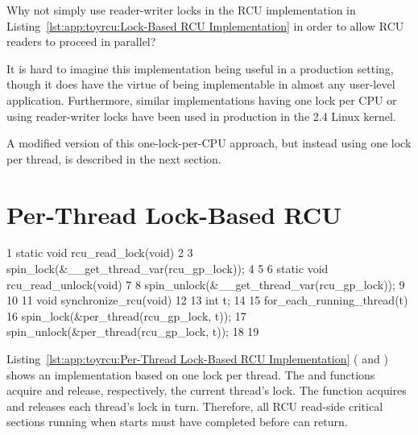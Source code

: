\QuickQuiz{}
	Why not simply use reader-writer locks in the RCU implementation
	in
	Listing~\ref{lst:app:toyrcu:Lock-Based RCU Implementation}
	in order to allow RCU readers to proceed in parallel?
 \QuickQuizEnd

It is hard to imagine this implementation being useful
in a production setting, though it does have the virtue
of being implementable in almost any user-level application.
Furthermore, similar implementations having one lock per CPU
or using reader-writer locks have been used in production
in the 2.4 Linux kernel.

A modified version of this one-lock-per-CPU approach, but instead using
one lock per thread, is described
in the next section.

\section{Per-Thread Lock-Based RCU}
\label{sec:app:toyrcu:Per-Thread Lock-Based RCU}

\begin{listing}[tbp]
{ \scriptsize
\begin{verbbox}
  1 static void rcu_read_lock(void)
  2 {
  3   spin_lock(&__get_thread_var(rcu_gp_lock));
  4 }
  5
  6 static void rcu_read_unlock(void)
  7 {
  8   spin_unlock(&__get_thread_var(rcu_gp_lock));
  9 }
 10
 11 void synchronize_rcu(void)
 12 {
 13   int t;
 14
 15   for_each_running_thread(t) {
 16     spin_lock(&per_thread(rcu_gp_lock, t));
 17     spin_unlock(&per_thread(rcu_gp_lock, t));
 18   }
 19 }
\end{verbbox}
}
\centering
\theverbbox
\caption{Per-Thread Lock-Based RCU Implementation}
\label{lst:app:toyrcu:Per-Thread Lock-Based RCU Implementation}
\end{listing}

Listing~\ref{lst:app:toyrcu:Per-Thread Lock-Based RCU Implementation}
( and )
shows an implementation based on one lock per thread.
The  and  functions
acquire and release, respectively, the current thread's lock.
The  function acquires and releases each thread's
lock in turn.
Therefore, all RCU read-side critical sections running
when  starts must have completed before
 can return.

